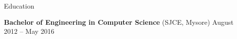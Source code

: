 \documentclass{resume} %
\begin{document}
\begin{rSection}{Education}

  {\bf Bachelor of Engineering in Computer Science} %
  {(SJCE, Mysore)} %
  \hfill {August 2012 -- May 2016} %



\end{rSection}

\end{document}
